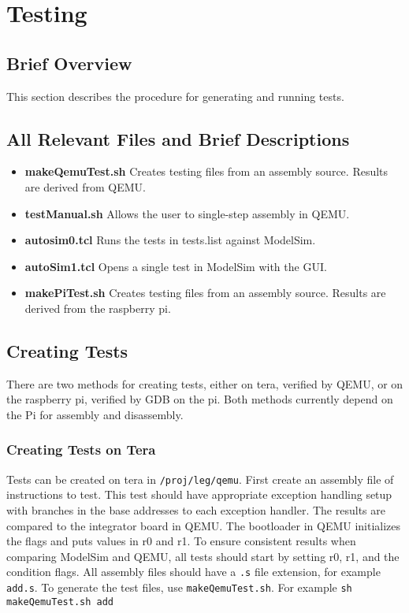 \section{Testing}

\subsection{Brief Overview}
This section describes the procedure for generating and running tests. 


\subsection{All Relevant Files and Brief Descriptions}
\begin{itemize}
\item \textbf{makeQemuTest.sh} Creates testing files from an assembly source. Results are derived from QEMU. 
\item \textbf{testManual.sh} Allows the user to single-step assembly in QEMU. 
\item \textbf{autosim0.tcl} Runs the tests in tests.list against ModelSim. 
\item \textbf{autoSim1.tcl} Opens a single test in ModelSim with the GUI. 
\item \textbf{makePiTest.sh} Creates testing files from an assembly source. Results are derived from the raspberry pi. 
\end{itemize}

\subsection{Creating Tests}
There are two methods for creating tests, either on tera, verified by QEMU, or on the raspberry pi, verified by GDB on the pi. Both methods currently depend on the Pi for assembly and disassembly. 
\subsubsection{Creating Tests on Tera}
Tests can be created on tera in \texttt{/proj/leg/qemu}. 
First create an assembly file of instructions to test. 
This test should have appropriate exception handling setup with branches in the base addresses to each exception handler. 
The results are compared to the integrator board in QEMU. 
The bootloader in QEMU initializes the flags and puts values in r0 and r1. 
To ensure consistent results when comparing ModelSim and QEMU, all tests should start by setting r0, r1, and the condition flags. 
All assembly files should have a \texttt{.s} file extension, for example \texttt{add.s}. To generate the test files, use \texttt{makeQemuTest.sh}. 
For example \texttt{sh makeQemuTest.sh add}

